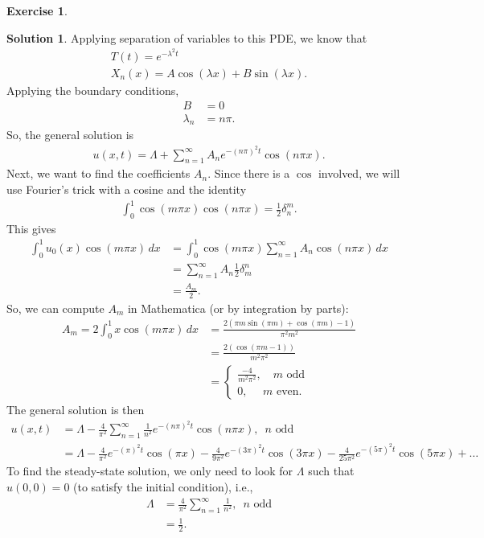 \documentclass{article}
\theoremstyle{definition}
\newtheorem*{exer*}{Exercise}
\newtheorem*{sln*}{Solution}
\begin{document}
\begin{exer*}
\begin{sln*}
		\noindent Applying separation of variables to this PDE, we know that 
		\begin{align*}
		T(t) = e^{-\lambda^2 t}\\
		X_n(x) = A\cos(\lambda x)  + B\sin(\lambda x).
		\end{align*}
		Applying the boundary conditions, 
		\begin{align*}
		B&= 0\\
		\lambda_n &= n\pi.
		\end{align*}
		So, the general solution is
		\begin{align*}
		u(x,t) = \Lambda + \sum_{n=1}^\infty A_n e^{-(n\pi)^2 t}\cos(n\pi x).
		\end{align*}
		Next, we want to find the coefficients $A_n$. Since there is a $\cos$ involved, we will use Fourier's trick with a cosine and the identity
		\begin{align*}
		\int_{0}^1\cos(m\pi x)\cos(n\pi x) = \frac{1}{2}\delta^m_n.
		\end{align*}
		This gives
		\begin{align*}
		\int_{0}^1 u_0(x)\cos(m\pi x)\,dx &= \int_{0}^1 \cos(m\pi x)\sum_{n=1}^\infty A_n \cos(n\pi x)\,dx\\
		&= \sum_{n=1}^\infty A_n \frac{1}{2}\delta^n_m\\
		&= \frac{A_m}{2}.
		\end{align*}
		So, we can compute $A_m$ in Mathematica (or by integration by parts):
		\begin{align*}
		A_m = 2\int_{0}^1 x\cos(m\pi x)\,dx &= \frac{2 (\pi  m \sin (\pi  m)+\cos (\pi  m)-1)}{\pi ^2 m^2}\\
		&= \frac{2(\cos(\pi m - 1))}{m^2\pi^2}\\
		&= \begin{cases}
		\frac{-4}{m^2\pi^2},\,\,\,\,\,\, m \text{ odd}\\
		0,\,\,\,\,\,\,\,\, m \text{ even}.
		\end{cases}
		\end{align*}
		The general solution is then
		\begin{align*}
		u(x,t) &= \Lambda-\frac{4}{\pi^2}\sum_{n=1}^\infty \frac{1}{n^2}e^{-(n\pi)^2 t}\cos(n\pi x),\,\,\, n \text{ odd}\\
		&= \Lambda-\frac{4}{\pi ^2}e^{-(\pi)^2 t}\cos(\pi x)    -\frac{4}{9 \pi ^2}e^{-(3\pi)^2 t}\cos(3\pi x)        -\frac{4}{25 \pi ^2}e^{-(5\pi)^2 t}\cos(5\pi x) + \dots
		\end{align*}
		To find the steady-state solution, we only need to look for $\Lambda$ such that $u(0,0) = 0$ (to satisfy the initial condition), i.e.,
		\begin{align*}
		\Lambda &= \frac{4}{\pi^2}\sum^\infty_{n=1}\frac{1}{n^2},\,\,\, n \text{ odd}\\
		&= \frac{1}{2}.
		\end{align*}
		

\end{sln*}
\end{exer*}
\end{document}
